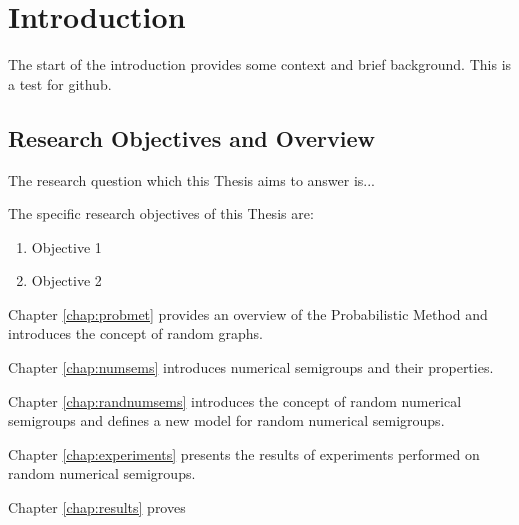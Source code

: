 \chapter{Introduction}\label{chap:intro}

The start of the introduction provides some context and brief background.
This is a test for github.
\section{Research Objectives and Overview}


The research question which this Thesis aims to answer is...


The specific research objectives of this Thesis are:

\begin{enumerate}
\item Objective 1
\item Objective 2
\end{enumerate}

Chapter \ref{chap:probmet} provides an overview of the Probabilistic Method and introduces the concept of random graphs. \par
Chapter \ref{chap:numsems} introduces numerical semigroups and their properties. \par
Chapter \ref{chap:randnumsems} introduces the concept of random numerical semigroups and defines a new model for random numerical semigroups. \par
Chapter \ref{chap:experiments} presents the results of experiments performed on random numerical semigroups. \par
Chapter \ref{chap:results} proves 